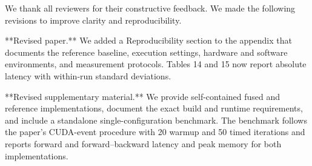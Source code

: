 \documentclass[11pt]{article}
\begin{document}
\begin{markdown}
We thank all reviewers for their constructive feedback. We made the following revisions to improve clarity and reproducibility.

**Revised paper.** We added a Reproducibility section to the appendix that documents the reference baseline, execution settings, hardware and software environments, and measurement protocols. Tables 14 and 15 now report absolute latency with within-run standard deviations.

**Revised supplementary material.** We provide self-contained fused and reference implementations, document the exact build and runtime requirements, and include a standalone single-configuration benchmark. The benchmark follows the paper's CUDA-event procedure with 20 warmup and 50 timed iterations and reports forward and forward--backward latency and peak memory for both implementations.
\end{markdown}
\end{document}
